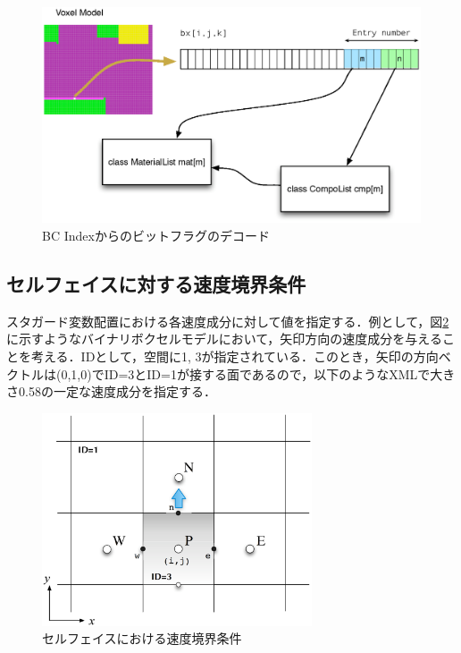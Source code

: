 \begin{figure}[htbp]
\begin{center}
\includegraphics[width=12cm,clip]{Decode.eps}
\end{center}
\caption{BC Indexからのビットフラグのデコード}
\label{fig:Decode}
\end{figure}


%
\subsection{セルフェイスに対する速度境界条件}
スタガード変数配置における各速度成分に対して値を指定する．例として，図\ref{fig:cell face BC}に示すようなバイナリボクセルモデルにおいて，矢印方向の速度成分を与えることを考える．IDとして，空間に1, 3が指定されている．このとき，矢印の方向ベクトルは(0,1,0)でID=3とID=1が接する面であるので，以下のようなXMLで大きさ0.58の一定な速度成分を指定する．

\begin{figure}[htbp]
\begin{center}
\includegraphics[width=8cm,clip]{Vface-mid.eps}
\end{center}
\caption{セルフェイスにおける速度境界条件}
\label{fig:cell face BC}
\end{figure}

